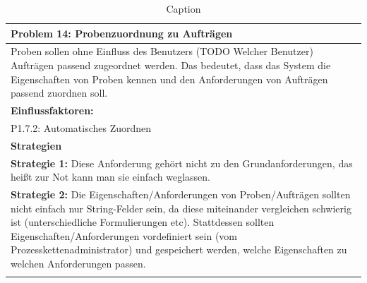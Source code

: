 \documentclass[enabledeprecatedfontcommands,fontsize=12pt,paper=a4,twoside]{scrartcl}
\begin{document}
\begin{table}[H]
    \centering
    \begin{tabular}{|p{15cm}|}
    \hline
          \textbf{Problem 14:} Probenzuordnung zu Aufträgen
          \\ \hline
          Proben sollen ohne Einfluss des Benutzers (TODO Welcher Benutzer) Aufträgen passend zugeordnet werden. Das bedeutet, dass das System die Eigenschaften von Proben kennen und den Anforderungen von Aufträgen passend zuordnen soll.
          \\ \hline
          \textbf{Einflussfaktoren: } \\
          P1.7.2: Automatisches Zuordnen \\ %
          \hline
          \textbf{Strategien} \\ \hline
          \textbf{Strategie 1:} Diese Anforderung gehört nicht zu den Grundanforderungen, das heißt zur Not kann man sie einfach weglassen. \\
	      \textbf{Strategie 2:} Die Eigenschaften/Anforderungen von Proben/Aufträgen sollten nicht einfach nur String-Felder sein, da diese miteinander vergleichen schwierig ist (unterschiedliche Formulierungen etc). Stattdessen sollten Eigenschaften/Anforderungen vordefiniert sein (vom Prozesskettenadministrator) und gespeichert werden, welche Eigenschaften zu welchen Anforderungen passen. \\
          \\ \hline
    \end{tabular}
    \caption{Caption}
    \label{tab:my_label}
\end{table}
\end{document}
